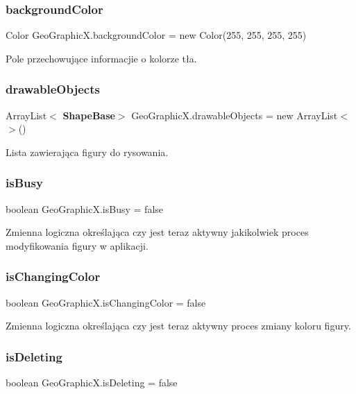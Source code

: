 \subsubsection{background\+Color}
{\footnotesize\ttfamily Color Geo\+Graphic\+X.\+background\+Color = new Color(255, 255, 255, 255)}

Pole przechowujące informacjie o kolorze tła. \mbox{\label{class_geo_graphic_x_afd603afbd5712aafc94fce5071103420}} 
\subsubsection{drawable\+Objects}
{\footnotesize\ttfamily Array\+List$<$\textbf{ Shape\+Base}$>$ Geo\+Graphic\+X.\+drawable\+Objects = new Array\+List$<$$>$()}

Lista zawierająca figury do rysowania. \mbox{\label{class_geo_graphic_x_a787097390f89889774c1450be0b9b391}} 
\subsubsection{is\+Busy}
{\footnotesize\ttfamily boolean Geo\+Graphic\+X.\+is\+Busy = false}

Zmienna logiczna określająca czy jest teraz aktywny jakikolwiek proces modyfikowania figury w aplikacji. \mbox{\label{class_geo_graphic_x_a60c08c0d7db0ced8cd69b14e1cfd8043}} 
\subsubsection{is\+Changing\+Color}
{\footnotesize\ttfamily boolean Geo\+Graphic\+X.\+is\+Changing\+Color = false}

Zmienna logiczna określająca czy jest teraz aktywny proces zmiany koloru figury. \mbox{\label{class_geo_graphic_x_aad9cb8ba8a8fc82934cb0b4220ab3d72}} 
\subsubsection{is\+Deleting}
{\footnotesize\ttfamily boolean Geo\+Graphic\+X.\+is\+Deleting = false}

